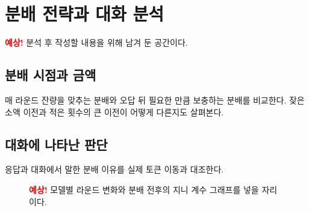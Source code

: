 \section{분배 전략과 대화 분석}\label{sec:strategies}

\noindent\textcolor{red}{\textbf{예상!}} 분석 후 작성할 내용을 위해 남겨 둔 공간이다.

\subsection{분배 시점과 금액}

매 라운드 잔량을 맞추는 분배와 오답 뒤 필요한 만큼 보충하는 분배를 비교한다.
잦은 소액 이전과 적은 횟수의 큰 이전이 어떻게 다른지도 살펴본다.

\subsection{대화에 나타난 판단}

응답과 대화에서 말한 분배 이유를 실제 토큰 이동과 대조한다.

\begin{figure}[t]
\centering
\resizebox{\textwidth}{!}{}
\caption{\textcolor{red}{\textbf{예상!}} 모델별 라운드 변화와 분배 전후의 지니 계수 그래프를 넣을 자리이다.}
\label{fig:arena-gini}
\end{figure}
